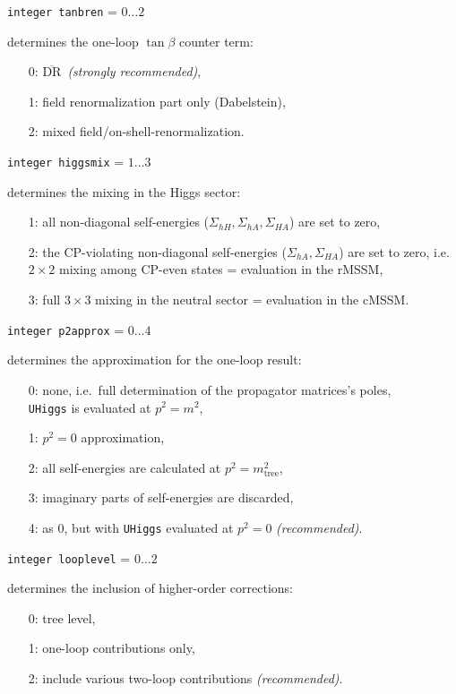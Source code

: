\documentclass[12pt,a4paper]{report}
\newcommand{\overbar}[1]{\ensuremath{\overline{\mathrm{#1}}}}
\newcommand{\CODE}[1]{\texttt{#1}}
\newcommand{\FLAGIN}[3]{%
  \item[\fbox{\scriptsize\textsc{in}}]
  \CODE{#1} = $#2\dots#3$ \par}
\newcommand\ie{i.e.\ }
\begin{document}
\FLAGIN{integer tanbren}{0}{2}
determines the one-loop $\tan\beta$ counter term:
\begin{itemize}
\item[0:] \overbar{DR}\ \textit{(strongly recommended)},
\item[1:] field renormalization part only (Dabelstein),
\item[2:] mixed field/on-shell-renormalization.
\end{itemize}

\FLAGIN{integer higgsmix}{1}{3}
determines the mixing in the Higgs sector:
\begin{itemize}
\item[1:] all non-diagonal self-energies ($\Sigma_{hH}, \Sigma_{hA}, 
          \Sigma_{HA}$) are set to zero,
\item[2:] the CP-violating non-diagonal self-energies ($\Sigma_{hA}, 
          \Sigma_{HA}$) are set to zero, \ie $2\times 2$ mixing among 
          CP-even states = evaluation in the rMSSM,
\item[3:] full $3\times 3$ mixing in the neutral sector
          = evaluation in the cMSSM.
\end{itemize}

\FLAGIN{integer p2approx}{0}{4}
determines the approximation for the one-loop result:
\begin{itemize}
\item[0:] none, \ie full determination of the propagator matrices's poles, \\
  \CODE{UHiggs} is evaluated at $p^2 = m^2$,
\item[1:] $p^2 = 0$ approximation,
\item[2:] all self-energies are calculated at $p^2 = m_{\text{tree}}^2$,
\item[3:] imaginary parts of self-energies are discarded,
\item[4:] as 0, but with \CODE{UHiggs} evaluated at $p^2 = 0$
  \textit{(recommended)}.
\end{itemize}

\FLAGIN{integer looplevel}{0}{2}
determines the inclusion of higher-order corrections:
\begin{itemize}
\item[0:] tree level,
\item[1:] one-loop contributions only,
\item[2:] include various two-loop contributions \textit{(recommended)}.
\end{itemize}
\end{document}
